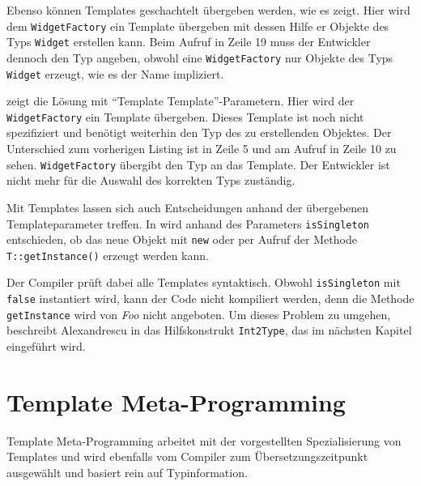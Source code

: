 

Ebenso können Templates geschachtelt übergeben werden, wie es  zeigt. Hier wird dem \texttt{WidgetFactory} ein Template übergeben mit dessen Hilfe er Objekte des Typs \texttt{Widget} erstellen kann. Beim Aufruf in Zeile 19 muss der Entwickler dennoch den Typ angeben, obwohl eine \texttt{WidgetFactory} nur Objekte des Typs \texttt{Widget} erzeugt, wie es der Name impliziert.



 zeigt die Lösung mit \enquote{Template Template}-Parametern. Hier wird der \texttt{WidgetFactory} ein Template übergeben. Dieses Template ist noch nicht spezifiziert und benötigt weiterhin den Typ des zu erstellenden Objektes. Der Unterschied zum vorherigen Listing ist in Zeile 5 und am Aufruf in Zeile 10 zu sehen. \texttt{WidgetFactory} übergibt den Typ an das Template. Der Entwickler ist nicht mehr für die Auswahl des korrekten Typs zuständig.



Mit Templates lassen sich auch Entscheidungen anhand der übergebenen Templateparameter treffen. In  wird anhand des Parameters \texttt{isSingleton} entschieden, ob das neue Objekt mit \texttt{new} oder per Aufruf der Methode \texttt{T::getInstance()} erzeugt werden kann.



Der Compiler prüft dabei alle Templates syntaktisch. Obwohl \texttt{isSingleton} mit \texttt{false} instantiert wird, kann der Code nicht kompiliert werden, denn die Methode \texttt{getInstance} wird von \emph{Foo} nicht angeboten. Um dieses Problem zu umgehen, beschreibt Alexandrescu in \cite{Alexandrescu2001Modern} das Hilfskonstrukt \texttt{Int2Type}, das im nächsten Kapitel eingeführt wird.

\section{Template Meta-Programming}
Template Meta-Programming arbeitet mit der vorgestellten Spezialisierung von Templates und wird ebenfalls vom Compiler zum Übersetzungszeitpunkt ausgewählt und basiert rein auf Typinformation.

